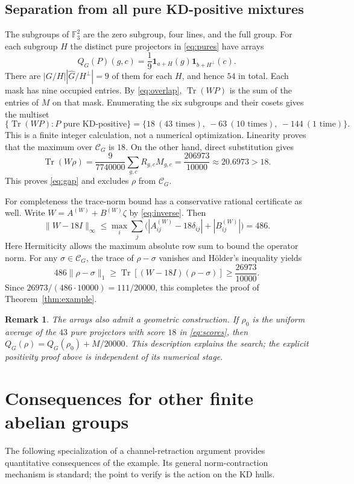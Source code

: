 \documentclass[11pt,a4paper]{article}
\theoremstyle{definition}
\theoremstyle{plain}
\newtheorem{remark}[theorem]{Remark}
\DeclareMathOperator{\Tr}{Tr}
\newcommand{\F}{\mathbb F}
\newcommand{\hull}{\mathcal C}
\begin{document}
\subsection{Separation from all pure KD-positive mixtures}
The subgroups of $\F_3^2$ are the zero subgroup, four lines, and the full
group. For each subgroup $H$ the distinct pure projectors in
\eqref{eq:pures} have arrays
\begin{equation}\label{eq:masks}
 Q_G(P)(g,c)=\frac19\mathbf1_{a+H}(g)\mathbf1_{b+H^\perp}(c).
\end{equation}
There are $|G/H||\widehat G/H^\perp|=9$ of them for each $H$,
and hence $54$ in total. Each mask has nine occupied entries.
By \eqref{eq:overlap}, $\Tr(WP)$ is the sum of the entries of $M$ on
that mask. Enumerating the six subgroups and their cosets gives the multiset
\begin{equation}\label{eq:scores}
 \{\Tr(WP):P\text{ pure KD-positive}\}
 =\{18\ (43\text{ times}),\ -63\ (10\text{ times}),\ -144\ (1\text{ time})\}.
\end{equation}
This is a finite integer calculation, not a numerical optimization.
Linearity proves that the maximum over $\hull_G$ is $18$.
On the other hand, direct substitution gives
\[
 \Tr(W\rho)=\frac9{7740000}\sum_{g,c}R_{g,c}M_{g,c}
 =\frac{206973}{10000}\approx20.6973>18.
\]
This proves \eqref{eq:gap} and excludes $\rho$ from $\hull_G$.

For completeness the trace-norm bound has a conservative rational
certificate as well. Write $W=A^{(W)}+B^{(W)}\zeta$ by
\eqref{eq:inverse}. Then
\[
 \|W-18I\|_\infty
 \leq\max_i\sum_j
 \bigl(|A^{(W)}_{ij}-18\delta_{ij}|+|B^{(W)}_{ij}|\bigr)=486.
\]
Here Hermiticity allows the maximum absolute row sum to bound the
operator norm. For any $\sigma\in\hull_G$, the trace of $\rho-\sigma$
vanishes and H\"older's inequality yields
\[
 486\|\rho-\sigma\|_1
 \geq\Tr[(W-18I)(\rho-\sigma)]
 \geq\frac{26973}{10000}.
\]
Since $26973/(486\cdot10000)=111/20000$, this completes the proof of
Theorem~\ref{thm:example}.

\begin{remark}
The arrays also admit a geometric construction. If $\rho_0$ is the uniform
average of the $43$ pure projectors with score $18$ in \eqref{eq:scores},
then $Q_G(\rho)=Q_G(\rho_0)+M/20000$. This description explains the search;
the explicit positivity proof above is independent of its numerical stage.
\end{remark}

\section{Consequences for other finite abelian groups}
The following specialization of a channel-retraction argument provides
quantitative consequences of the example. Its general norm-contraction
mechanism is standard; the point to verify is the action on the KD hulls.
\end{document}

